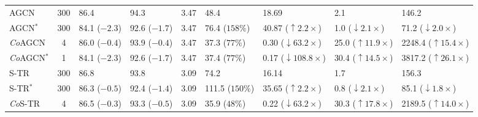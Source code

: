 \documentclass[journal]{IEEEtran}
\theoremstyle{definition}
\begin{document}
\begin{table*}[!tbp]
\begin{center}
{\begin{tabular}{lclllllll}
    \midrule
    AGCN                                & 300   & 86.4  & 94.3  & 3.47   & \phantom{0}48.4  & 18.69     & \phantom{0}2.1   & \phantom{0}146.2 \\
    
    AGCN$^*$                            & 300   & 84.1 \textcolor{lred}{($-2.3$)}  & 92.6 \textcolor{lred}{($-1.7$)}  & 3.47        & \phantom{0}76.4 \textcolor{lred}{($158\%$)}   & 40.87
    \textcolor{lred}{\phantom{00}($\uparrow2.2\times$)}     & \phantom{0}1.0 \textcolor{lred}{\phantom{0}($\downarrow2.1\times$)}     & \phantom{00}71.2 \phantom{0}\textcolor{lred}{($\downarrow2.0\times$)} \\
    
    \textit{Co}AGCN                     & 4     & 86.0 \textcolor{lred}{($-0.4$)} & 93.9 \textcolor{lred}{($-0.4$)} & 3.47     & \phantom{0}37.3 \phantom{0}\textcolor{lgreen}{($77\%$)}       & \phantom{0}0.30 \textcolor{lgreen}{\phantom{0}($\downarrow63.2\times$)}     & 25.0 \textcolor{lgreen}{($\uparrow11.9\times$)}     & 2248.4 \textcolor{lgreen}{($\uparrow15.4\times$)} \\
    
    \textit{Co}AGCN$^*$                 & 1     & 84.1 \textcolor{lred}{($-2.3$)}  & 92.6 \textcolor{lred}{($-1.7$)}  & 3.47   & \phantom{0}37.4 \phantom{0}\textcolor{lgreen}{($77\%$)}       & \phantom{0}0.17 \textcolor{lgreen}{($\downarrow108.8\times$)}      & 30.4 \textcolor{lgreen}{($\uparrow14.5\times$)}     & 3817.2 \textcolor{lgreen}{($\uparrow26.1\times$)} \\
    
    \midrule
    S-TR                                & 300   & 86.8     & 93.8     & 3.09    & \phantom{0}74.2      & 16.14         & \phantom{0}1.7     & \phantom{0}156.3 \\
    
    S-TR$^*$                            & 300   & 86.3 \textcolor{lred}{($-0.5$)}      & 92.4 \textcolor{lred}{($-1.4$)}     & 3.09    & 111.5 \textcolor{lred}{($150\%$)}      & 35.65 \textcolor{lred}{\phantom{00}($\uparrow2.2\times$)}        & \phantom{0}0.8 \textcolor{lred}{\phantom{0}($\downarrow2.1\times$)}     & \phantom{00}85.1 \phantom{0}\textcolor{lred}{($\downarrow1.8\times$)} \\
    
    \textit{Co}S-TR                     & 4     & 86.5 \textcolor{lred}{($-0.3$)}     & 93.3 \textcolor{lred}{($-0.5$)}      & 3.09    & \phantom{0}35.9 \phantom{0}\textcolor{lgreen}{($48\%$)}      & \phantom{0}0.22 \textcolor{lgreen}{\phantom{0}($\downarrow63.2\times$)}         & 30.3 \textcolor{lgreen}{($\uparrow17.8\times$)}     & 2189.5 \textcolor{lgreen}{($\uparrow14.0\times$)} \\
    

\end{tabular}}
\end{center}
\end{table*}
\end{document}

